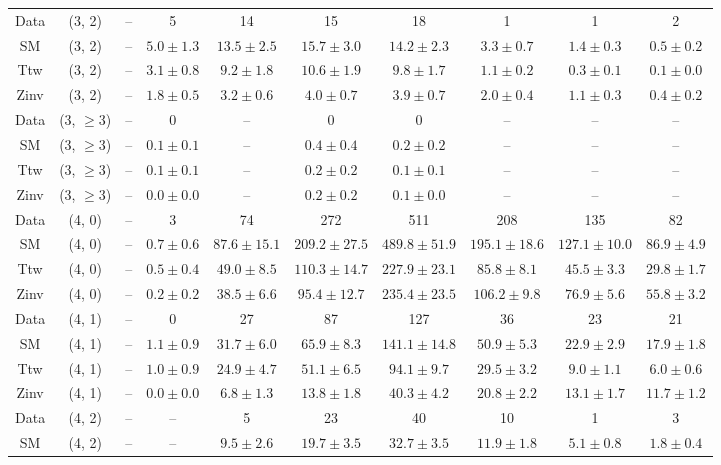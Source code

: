 \begin{table}[h!]
{\begin{tabular}{cccccccccc}
	Data & (3, 2) & -- & 5 & 14 & 15 & 18 & 1 & 1 & 2 \\[0.5ex] 
	SM & (3, 2) & -- & $5.0\pm 1.3$ & $13.5\pm 2.5$ & $15.7\pm 3.0$ & $14.2\pm 2.3$ & $3.3\pm 0.7$ & $1.4\pm 0.3$ & $0.5\pm 0.2$ \\[0.5ex] 
	Ttw & (3, 2) & -- & $3.1\pm 0.8$ & $9.2\pm 1.8$ & $10.6\pm 1.9$ & $9.8\pm 1.7$ & $1.1\pm 0.2$ & $0.3\pm 0.1$ & $0.1\pm 0.0$ \\[0.5ex] 
	Zinv & (3, 2) & -- & $1.8\pm 0.5$ & $3.2\pm 0.6$ & $4.0\pm 0.7$ & $3.9\pm 0.7$ & $2.0\pm 0.4$ & $1.1\pm 0.3$ & $0.4\pm 0.2$ \\[0.5ex] 
	Data & (3, $\ge3$) & -- & 0 & -- & 0 & 0 & -- & -- & -- \\[0.5ex] 
	SM & (3, $\ge3$) & -- & $0.1\pm 0.1$ & -- & $0.4\pm 0.4$ & $0.2\pm 0.2$ & -- & -- & -- \\[0.5ex] 
	Ttw & (3, $\ge3$) & -- & $0.1\pm 0.1$ & -- & $0.2\pm 0.2$ & $0.1\pm 0.1$ & -- & -- & -- \\[0.5ex] 
	Zinv & (3, $\ge3$) & -- & $0.0\pm 0.0$ & -- & $0.2\pm 0.2$ & $0.1\pm 0.0$ & -- & -- & -- \\[0.5ex] 
	Data & (4, 0) & -- & 3 & 74 & 272 & 511 & 208 & 135 & 82 \\[0.5ex] 
	SM & (4, 0) & -- & $0.7\pm 0.6$ & $87.6\pm 15.1$ & $209.2\pm 27.5$ & $489.8\pm 51.9$ & $195.1\pm 18.6$ & $127.1\pm 10.0$ & $86.9\pm 4.9$ \\[0.5ex] 
	Ttw & (4, 0) & -- & $0.5\pm 0.4$ & $49.0\pm 8.5$ & $110.3\pm 14.7$ & $227.9\pm 23.1$ & $85.8\pm 8.1$ & $45.5\pm 3.3$ & $29.8\pm 1.7$ \\[0.5ex] 
	Zinv & (4, 0) & -- & $0.2\pm 0.2$ & $38.5\pm 6.6$ & $95.4\pm 12.7$ & $235.4\pm 23.5$ & $106.2\pm 9.8$ & $76.9\pm 5.6$ & $55.8\pm 3.2$ \\[0.5ex] 
	Data & (4, 1) & -- & 0 & 27 & 87 & 127 & 36 & 23 & 21 \\[0.5ex] 
	SM & (4, 1) & -- & $1.1\pm 0.9$ & $31.7\pm 6.0$ & $65.9\pm 8.3$ & $141.1\pm 14.8$ & $50.9\pm 5.3$ & $22.9\pm 2.9$ & $17.9\pm 1.8$ \\[0.5ex] 
	Ttw & (4, 1) & -- & $1.0\pm 0.9$ & $24.9\pm 4.7$ & $51.1\pm 6.5$ & $94.1\pm 9.7$ & $29.5\pm 3.2$ & $9.0\pm 1.1$ & $6.0\pm 0.6$ \\[0.5ex] 
	Zinv & (4, 1) & -- & $0.0\pm 0.0$ & $6.8\pm 1.3$ & $13.8\pm 1.8$ & $40.3\pm 4.2$ & $20.8\pm 2.2$ & $13.1\pm 1.7$ & $11.7\pm 1.2$ \\[0.5ex] 
	Data & (4, 2) & -- & -- & 5 & 23 & 40 & 10 & 1 & 3 \\[0.5ex] 
	SM & (4, 2) & -- & -- & $9.5\pm 2.6$ & $19.7\pm 3.5$ & $32.7\pm 3.5$ & $11.9\pm 1.8$ & $5.1\pm 0.8$ & $1.8\pm 0.4$ \\[0.5ex] 

\end{tabular}}
\end{table}
